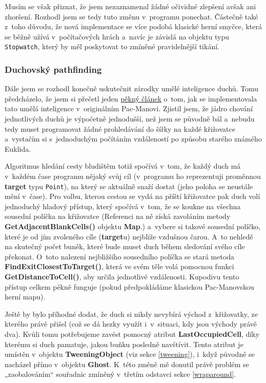 \documentclass[a4]{article}
\begin{document}
Musím se však přiznat, že jsem nezaznamenal žádné očividné zlepšení avšak ani zhoršení. Rozhodl jsem se tedy tuto změnu v~programu ponechat. Částečně také z~toho důvodu, že nová implementace se více podobá klasické herní smyčce, která se běžně užívá v~počítačových hrách a~navíc je závislá na objektu typu \verb|Stopwatch|, který by měl poskytovat to zmíněné pravidelnější tikání.

\subsubsection{Duchovský pathfinding} \label{ghostpathfinding}
Dále jsem se rozhodl konečně uskutečnit zárodky umělé inteligence duchů. Tomu předcházelo, že jsem si přečetl jeden \href{https://www.gamedeveloper.com/design/the-pac-man-dossier}{pěkný článek} o~tom, jak se implementovala tato umělá inteligence v~originálním Pac-Manovi. Zjistil jsem, že jádro chování jednotlivých duchů je výpočetně jednodušší, než jsem se původně bál a~nebudu tedy muset programovat žádné prohledávání do šířky na každé křižovatce a~vystačím si s~jednoduchým počítáním vzdáleností po způsobu starého známého Euklida. 

Algoritmus hledání cesty bludištěm totiž spočívá v~tom, že každý duch má v~každém čase programu nějaký svůj cíl (v~programu ho reprezentuji proměnnou \textbf{target} typu \verb|Point|), na který se aktuálně snaží dostat (jeho poloha se neustále mění v~čase). Pro volbu, kterou cestou se vydá na příští křižovatce pak duch volí jednoduchý hladový přístup, který spočívá v~tom, že se koukne na všechna sousední políčka na křižovatce (Referenci na ně získá zavoláním metody \textbf{GetAdjacentBlankCells()} objektu \textbf{Map}.) a~vybere si takové sousední políčko, které je od jím zvoleného cíle (\textbf{target}u) nejblíže vzdušnou čarou. A~to nehledě na skutečný počet buněk, které bude muset duch během sledování svého cíle překonat. O~toto nalezení nejbližšího sousedního políčka se stará metoda \textbf{FindExitClosestToTarget()}, která ve svém těle volá pomocnou funkci \textbf{GetDistanceToCell()}, aby určila jednotlivé vzdálenosti. Kupodivu tento přístup celkem pěkně funguje (pokud předpokládáme klasickou Pac-Manovskou herní mapu).

Ještě by bylo příhodné dodat, že duch si nikdy nevybírá východ z~křižovatky, ze kterého právě přišel (což se dá hezky využít i~v~situaci, kdy jsou východy právě dva). Kvůli tomu potřebujeme zavést pomocný atribut \textbf{LastOccupiedCell}, díky kterému si duch pamatuje, jakou buňku posledně navštívit. Tento atribut je umístěn v~objektu \textbf{TweeningObject} (viz sekce \ref{tweening}), i~když původně se nacházel přímo v~objektu \textbf{Ghost}. K~této změně mě donutil právě problém se „zaobalováním“ souřadnic zmíněný v~třetím odstavci sekce \ref{wraparound}.
\end{document}
